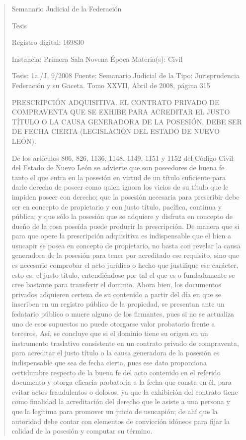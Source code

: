 \documentclass[11pt,a4paper]{article}
\begin{document}
\begin{quote}
                                                   Semanario Judicial de la Federación

                                                  Tesis

 Registro digital: 169830

 Instancia: Primera Sala          Novena Época                          Materia(s): Civil

 Tesis: 1a./J. 9/2008             Fuente: Semanario Judicial de la      Tipo: Jurisprudencia
                                  Federación y su Gaceta.
                                  Tomo XXVII, Abril de 2008, página
                                  315


PRESCRIPCIÓN ADQUISITIVA. EL CONTRATO PRIVADO DE COMPRAVENTA QUE SE EXHIBE
PARA ACREDITAR EL JUSTO TÍTULO O LA CAUSA GENERADORA DE LA POSESIÓN, DEBE
SER DE FECHA CIERTA (LEGISLACIÓN DEL ESTADO DE NUEVO LEÓN).


De los artículos 806, 826, 1136, 1148, 1149, 1151 y 1152 del Código Civil del Estado de Nuevo
León se advierte que son poseedores de buena fe tanto el que entra en la posesión en virtud de un
título suficiente para darle derecho de poseer como quien ignora los vicios de su título que le
impiden poseer con derecho; que la posesión necesaria para prescribir debe ser en concepto de
propietario y con justo título, pacífica, continua y pública; y que sólo la posesión que se adquiere y
disfruta en concepto de dueño de la cosa poseída puede producir la prescripción. De manera que si
para que opere la prescripción adquisitiva es indispensable que el bien a usucapir se posea en
concepto de propietario, no basta con revelar la causa generadora de la posesión para tener por
acreditado ese requisito, sino que es necesario comprobar el acto jurídico o hecho que justifique ese
carácter, esto es, el justo título, entendiéndose por tal el que es o fundadamente se cree bastante
para transferir el dominio. Ahora bien, los documentos privados adquieren certeza de su contenido a
partir del día en que se inscriben en un registro público de la propiedad, se presentan ante un
fedatario público o muere alguno de los firmantes, pues si no se actualiza uno de esos supuestos no
puede otorgarse valor probatorio frente a terceros. Así, se concluye que si el dominio tiene su origen
en un instrumento traslativo consistente en un contrato privado de compraventa, para acreditar el
justo título o la causa generadora de la posesión es indispensable que sea de fecha cierta, pues ese
dato proporciona certidumbre respecto de la buena fe del acto contenido en el referido documento y
otorga eficacia probatoria a la fecha que consta en él, para evitar actos fraudulentos o dolosos, ya
que la exhibición del contrato tiene como finalidad la acreditación del derecho que le asiste a una
persona y que la legitima para promover un juicio de usucapión; de ahí que la autoridad debe contar
con elementos de convicción idóneos para fijar la calidad de la posesión y computar su término.



\end{quote}
\end{document}
